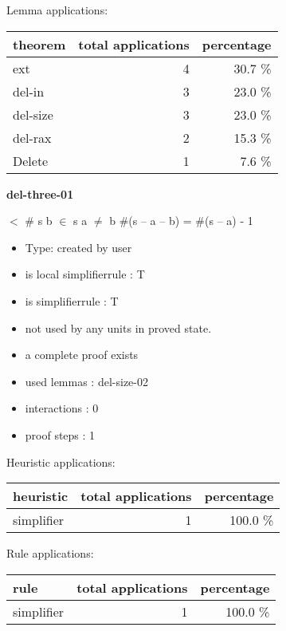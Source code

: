 \documentclass[a4paper]{article}
\begin{document}
Lemma applications:

\begin{supertabular}{l|r|r}
theorem	        & total applications & percentage \\ \hline
ext & 4 & 30.7 \% \\
del-in & 3 & 23.0 \% \\
del-size & 3 & 23.0 \% \\
del-rax & 2 & 15.3 \% \\
Delete & 1 & 7.6 \% \\

\end{supertabular}
\pagebreak

{\LARGE\bf del-three-01}\label{lemma-del-three-01}

\medskip

  $<$ \# s \And b $\in$ s \And a $\neq$ b \Imp \#(s -- a -- b) = \#(s -- a) - 1

\begin{itemize}

\item Type: created by user

\item is local simplifierrule : T
\item is simplifierrule : T
\item not used by any units in proved state.
\item       a complete proof exists
\item       used lemmas  : del-size-02
\item       interactions : 0
\item       proof steps  : 1
\end{itemize}

\medskip


Heuristic applications:

\begin{supertabular}{l|r|r}
heuristic	& total applications & percentage \\ \hline
simplifier & 1 & 100.0 \% \\

\end{supertabular}

Rule applications:

\begin{supertabular}{l|r|r}
rule	        & total applications & percentage \\ \hline
simplifier & 1 & 100.0 \% \\

\end{supertabular}
\end{document}
